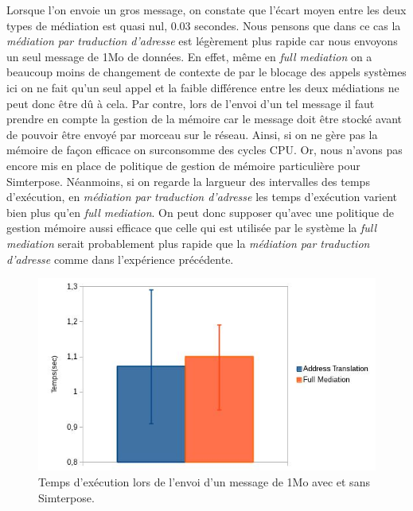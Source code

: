 Lorsque l'on envoie un gros message, on constate que l'écart moyen entre les deux types de médiation est quasi nul, 0.03 secondes. Nous pensons que dans ce cas la \textit{médiation par traduction d'adresse} est légèrement plus rapide car nous envoyons un seul message de 1Mo de données. En effet, même en \textit{full mediation} on a beaucoup moins de changement de contexte de par le blocage des appels systèmes ici on ne fait qu'un seul appel et la faible différence entre les deux médiations ne peut donc être dû à cela. Par contre, lors de l'envoi d'un tel message il faut prendre en compte la gestion de la mémoire car le message doit être stocké avant de pouvoir être envoyé par morceau sur le réseau. Ainsi, si on ne gère pas la mémoire de façon efficace on surconsomme des cycles CPU. Or, nous n'avons pas encore mis en place de politique de gestion de mémoire particulière pour Simterpose. Néanmoins, si on regarde la largueur des intervalles des temps d'exécution, en \textit{médiation par traduction d'adresse} les temps d'exécution varient bien plus qu'en \textit{full mediation}. On peut donc supposer qu'avec une politique de gestion mémoire aussi efficace que celle qui est utilisée par le système la \textit{full mediation} serait probablement plus rapide que la \textit{médiation par traduction d'adresse} comme dans l'expérience précédente.

\begin{figure}
  \centering
    \includegraphics[scale=0.5]{mesures/graph/Bigmsg.jpg}
    \caption{Temps d'exécution lors de l'envoi d'un message de 1Mo avec et sans Simterpose.}
    \label{Network_Big_Mediation}
\end{figure}

